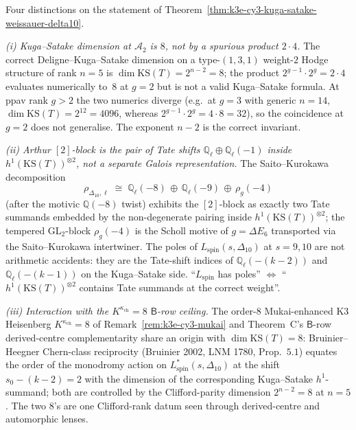 \begin{remark}[{Arthur \texorpdfstring{$[2]$}{[2]}-block \texorpdfstring{$=$}{=} Hodge-Tate shift of \texorpdfstring{$h^1(\mathrm{KS}(T))^{\otimes 2}$}{h-1(KS(T))-(x) 2}; dimension \texorpdfstring{$8$}{8}, not \texorpdfstring{$16$}{16}; interaction with the \texorpdfstring{$K^{\kappa_{\mathrm{ch}}} = 8$}{K-kappa-ch = 8} \texorpdfstring{$\mathsf B$}{B}-row ceiling}]
\label{rem:k3e-cy3-kuga-satake-arthur-hodge-shift}
Four distinctions on the statement of Theorem~\ref{thm:k3e-cy3-kuga-satake-weissauer-delta10}.

\emph{(i) Kuga--Satake dimension at $\mathcal A_2$ is $8$, not by a spurious product $2\cdot 4$.} The correct Deligne--Kuga--Satake dimension on a type-$(1, 3, 1)$ weight-$2$ Hodge structure of rank $n=5$ is $\dim \mathrm{KS}(T) = 2^{n-2} = 8$; the product $2^{g-1} \cdot 2^g = 2 \cdot 4$ evaluates numerically to~$8$ at $g=2$ but is not a valid Kuga--Satake formula. At ppav rank $g > 2$ the two numerics diverge (e.g.\ at $g = 3$ with generic $n = 14$, $\dim \mathrm{KS}(T) = 2^{12} = 4096$, whereas $2^{g-1}\cdot 2^g = 4\cdot 8 = 32$), so the coincidence at $g=2$ does not generalise. The exponent $n-2$ is the correct invariant.

\emph{(ii) Arthur $[2]$-block is the pair of Tate shifts $\mathbb Q_\ell \oplus \mathbb Q_\ell(-1)$ inside $h^1(\mathrm{KS}(T))^{\otimes 2}$, not a separate Galois representation.} The Saito--Kurokawa decomposition
\[
 \rho_{\Delta_{10}, \ell} \;\cong\; \mathbb Q_\ell(-8) \,\oplus\, \mathbb Q_\ell(-9) \,\oplus\, \rho_g(-4)
\]
(after the motivic $\mathbb Q(-8)$ twist) exhibits the $[2]$-block as exactly two Tate summands embedded by the non-degenerate pairing inside $h^1(\mathrm{KS}(T))^{\otimes 2}$; the tempered GL$_2$-block $\rho_g(-4)$ is the Scholl motive of $g = \Delta E_6$ transported via the Saito--Kurokawa intertwiner. The poles of $L_{\mathrm{spin}}(s, \Delta_{10})$ at $s = 9, 10$ are not arithmetic accidents: they are the Tate-shift indices of $\mathbb Q_\ell(-(k-2))$ and $\mathbb Q_\ell(-(k-1))$ on the Kuga--Satake side. ``$L_{\mathrm{spin}}$ has poles'' $\Leftrightarrow$ ``$h^1(\mathrm{KS}(T))^{\otimes 2}$ contains Tate summands at the correct weight''.

\emph{(iii) Interaction with the $K^{\kappa_{\mathrm{ch}}} = 8$ $\mathsf B$-row ceiling.} The order-$8$ Mukai-enhanced K3 Heisenberg $K^{\kappa_{\mathrm{ch}}} = 8$ of Remark~\ref{rem:k3e-cy3-mukai} and Theorem~C's $\mathsf B$-row derived-centre complementarity share an origin with $\dim \mathrm{KS}(T) = 8$: Bruinier--Heegner Chern-class reciprocity \textup{(}Bruinier 2002, LNM 1780, Prop.~$5.1$\textup{)} equates the order of the monodromy action on $L^*_{\mathrm{spin}}(s, \Delta_{10})$ at the shift $s_0 - (k-2) = 2$ with the dimension of the corresponding Kuga--Satake $h^1$-summand; both are controlled by the Clifford-parity dimension $2^{n-2} = 8$ at $n = 5$. The two $8$'s are one Clifford-rank datum seen through derived-centre and automorphic lenses.


\end{remark}
